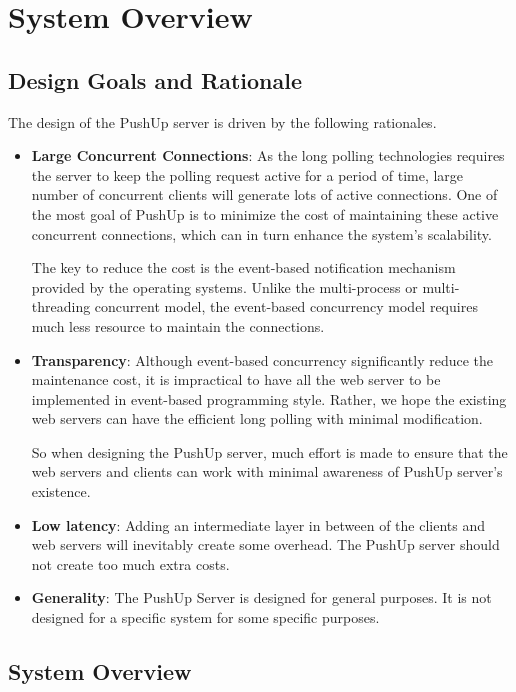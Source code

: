 \section {System Overview\\}

\subsection{Design Goals and Rationale\\}
The design of the PushUp server is driven by the following rationales.
\begin{itemize}
\item {\bf Large Concurrent Connections}:
    As the long polling technologies requires the server to keep the polling
    request active for a period of time, large number of concurrent clients 
    will generate lots of active connections. One of the most goal of PushUp
    is to minimize the cost of maintaining these active concurrent connections,
    which can in turn enhance the system's scalability.
     
    The key to reduce the cost is the event-based notification mechanism provided
    by the operating systems. Unlike the multi-process or multi-threading concurrent
    model, the event-based concurrency model requires much less resource to maintain
    the connections.
\item {\bf Transparency}: Although event-based concurrency significantly reduce the 
    maintenance cost, it is impractical to have all the web server to be implemented
    in event-based programming style. Rather, we hope the existing web servers can 
    have the efficient long polling with minimal modification.

    So when designing the PushUp server, much effort is made to ensure that 
    the web servers and clients can work with minimal awareness of PushUp 
    server's existence.
\item {\bf Low latency}: Adding an intermediate layer in between of the 
    clients and web servers will inevitably create some overhead. 
    The PushUp server should not create too much extra costs.

\item {\bf Generality}: The PushUp Server is designed for general purposes. It is
    not designed for a specific system for some specific purposes.

\end{itemize}

\subsection{System Overview\\}

